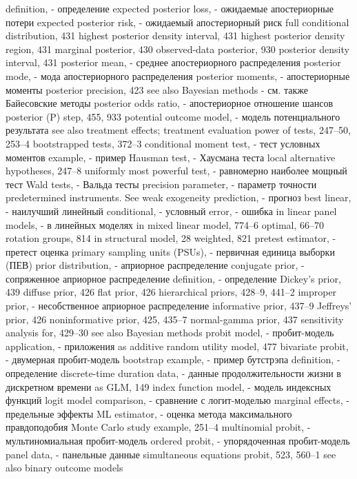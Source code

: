 definition, - определение
expected posterior loss, - ожидаемые апостериорные потери
expected posterior risk, - ожидаемый апостериорный риск
full conditional distribution, 431 highest posterior density interval, 431 highest posterior density region, 431 marginal posterior, 430 observed-data posterior, 930 
posterior density interval, 431 
posterior mean, - среднее апостериорного распределения
posterior mode, - мода апостериорного распределения
posterior moments, - апостериорные моменты
posterior precision, 423
see also Bayesian methods - см. также Байесовские методы
posterior odds ratio, - апостериорное отношение шансов
posterior (P) step, 455, 933
potential outcome model, - модель потенциального результата
see also treatment effects; treatment evaluation power of tests, 247–50, 253–4
bootstrapped tests, 372–3 
conditional moment test, - тест условных моментов
example, - пример
Hausman test, - Хаусмана теста
local alternative hypotheses, 247–8 
uniformly most powerful test, - равномерно наиболее мощный тест
Wald tests, - Вальда тесты
precision parameter, - параметр точности
predetermined instruments. See weak exogeneity 
prediction, - прогноз
best linear, - наилучший линейный
conditional, - условный
error, - ошибка
in linear panel models, - в линейных моделях
in mixed linear model, 774–6 optimal, 66–70
rotation groups, 814 in structural model, 28 weighted, 821
pretest estimator, - претест оценка
primary sampling units (PSUs), - первичная единица выборки (ПЕВ)
prior distribution, - априорное распределение
conjugate prior, - сопряженное априорное распределение 
definition, - определение
Dickey’s prior, 439 
diffuse prior, 426
flat prior, 426
hierarchical priors, 428–9, 441–2 
improper prior, - несобственное априорное распределение
informative prior, 437–9 Jeffreys’ prior, 426 
noninformative prior, 425, 435–7 normal-gamma prior, 437 sensitivity analysis for, 429–30 see also Bayesian methods
probit model, - пробит-модель
application, - приложения
as additive random utility model, 477 
bivariate probit, - двумерная пробит-модель
bootstrap example, - пример бутстрэпа
definition, - определение
discrete-time duration data, - данные продолжительности жизни в дискретном времени
as GLM, 149
index function model, - модель индексных функций
logit model comparison, - сравнение с логит-моделью
marginal effects, - предельные эффекты
ML estimator, - оценка метода максимального правдоподобия
Monte Carlo study example, 251–4 
multinomial probit, - мультиномиальная пробит-модель
ordered probit, - упорядоченная пробит-модель
panel data, - панельные данные
simultaneous equations probit, 523, 560–1 see also binary outcome models
